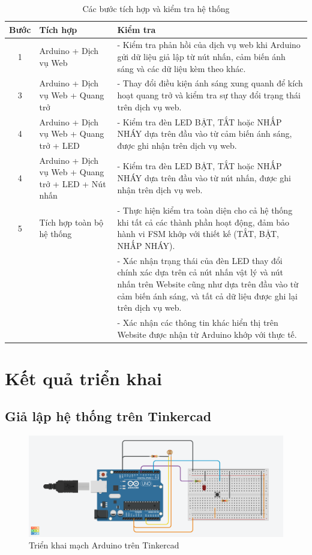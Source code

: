 \begin{table}[h!]
\centering
\small
\begin{tabular}{|c|p{4cm}|p{8cm}|}
\hline
\textbf{Bước} & \textbf{Tích hợp} & \textbf{Kiểm tra} \\ \hline
1 & Arduino + Dịch vụ Web & - Kiểm tra phản hồi của dịch vụ web khi Arduino gửi dữ liệu giả lập từ nút nhấn, cảm biến ánh sáng và các dữ liệu kèm theo khác. \\ \hline
3 & Arduino + Dịch vụ Web + Quang trở & - Thay đổi điều kiện ánh sáng xung quanh để kích hoạt quang trở và kiểm tra sự thay đổi trạng thái trên dịch vụ web. \\ \hline
4 & Arduino + Dịch vụ Web + Quang trở + LED & - Kiểm tra đèn LED BẬT, TẮT hoặc NHẤP NHÁY dựa trên đầu vào từ cảm biến ánh sáng, được ghi nhận trên dịch vụ web. \\ \hline
4 & Arduino + Dịch vụ Web + Quang trở + LED + Nút nhấn & - Kiểm tra đèn LED BẬT, TẮT hoặc NHẤP NHÁY dựa trên đầu vào từ nút nhấn, được ghi nhận trên dịch vụ web. \\ \hline
5 & Tích hợp toàn bộ hệ thống & - Thực hiện kiểm tra toàn diện cho cả hệ thống khi tất cả các thành phần hoạt động, đảm bảo hành vi FSM khớp với thiết kế (TẮT, BẬT, NHẤP NHÁY). \\
  & & - Xác nhận trạng thái của đèn LED thay đổi chính xác dựa trên cả nút nhấn vật lý và nút nhấn trên Website cũng như dựa trên đầu vào từ cảm biến ánh sáng, và tất cả dữ liệu được ghi lại trên dịch vụ web. \\
  & & - Xác nhận các thông tin khác hiển thị trên Website được nhận từ Arduino khớp với thực tế. \\ \hline
\end{tabular}
\caption{Các bước tích hợp và kiểm tra hệ thống}
\label{tab:integration_check}
\end{table}

\pagebreak
\section{Kết quả triển khai}
\subsection{Giả lập hệ thống trên Tinkercad }
\begin{figure}[H]
    \centering
    \includegraphics[scale=0.35]{img/Tinkercad.png}
    \caption{Triển khai mạch Arduino trên Tinkercad}
    \label{fig:my_label}
\end{figure}

